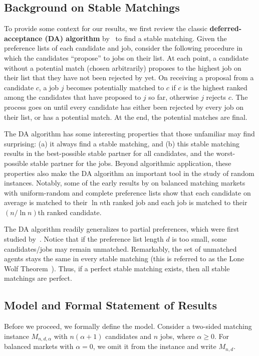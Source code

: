 \documentclass[11pt]{amsart}
\newcommand{\defn}{\textbf}
\begin{document}
\subsection{Background on Stable Matchings}
To provide some context for our results, we first review the classic \defn{deferred-acceptance (DA) algorithm}  by~\cite{mcvitie1970stable, gale1962college} to find a stable matching.  
Given the preference lists of each candidate and job, consider the following procedure in which the candidates ``propose'' to jobs on their list. At each point, a candidate without a potential match (chosen arbitrarily) proposes to the highest job on their list that they have not been rejected by yet. On receiving a proposal from a candidate $c$, a job $j$ becomes potentially matched to $c$ if $c$ is the highest ranked among the candidates that have proposed to $j$ so far, otherwise $j$ rejects $c$. The process goes on until every candidate has either been rejected by every job on their list, or has a potential match. At the end, the potential matches are final.  

The DA algorithm has some interesting properties that those unfamiliar may find surprising: (a) it always find a stable matching, and (b) this stable matching results in the best-possible stable partner for all candidates, and the worst-possible stable partner for the jobs.  Beyond algorithmic application, these properties also make the DA algorithm an important tool in the study of random instances. Notably, some of the early results by \cite{wilson1972analysis, knuth1976mariages, pittel1989average} on balanced matching markets with uniform-random and complete preference lists show that each candidate on average is matched to their $\ln n$th ranked job and each job is matched to their $(n/\ln n)$th ranked candidate. 

The DA algorithm readily generalizes to partial preferences, which were first studied by~\cite{gusfield1989stable}.  Notice that if the preference list length $d$ is too small, some candidates/jobs may remain unmatched.  Remarkably, the set of unmatched agents stays the same in every stable matching (this is referred to as the Lone Wolf Theorem~\cite{mcvitie1971stable}).  Thus, if a perfect stable matching exists, then all stable matchings are perfect.  


\subsection{Model and Formal Statement of Results}
Before we proceed, we formally define the model. Consider a two-sided matching instance $M_{n, d, \alpha}$ with $n(\alpha+1)$ candidates and $n$ jobs, where $\alpha \geq 0$. For balanced markets with $\alpha = 0$, we omit it from the instance and write $M_{n,d}$.
\end{document}
